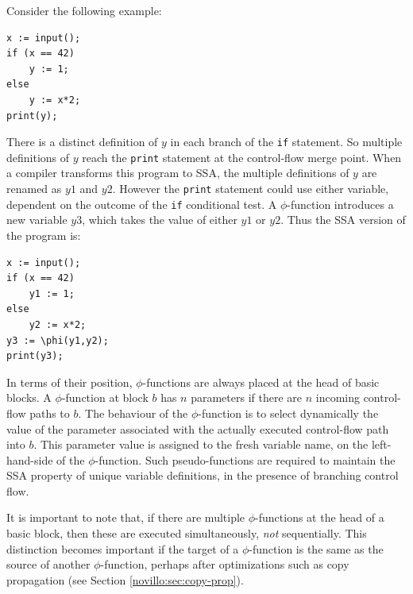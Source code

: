 Consider the following example:

\begin{verbatim}
x := input();
if (x == 42)
    y := 1;
else
    y := x*2;
print(y);
\end{verbatim}

There is a distinct definition of $y$ in each branch of the \texttt{if}
statement. So multiple definitions of $y$ reach the \texttt{print} statement
at the control-flow merge point. When a compiler transforms this program 
to SSA,
the multiple definitions of $y$ are renamed as $y1$ and $y2$. However 
the \texttt{print} statement could use either variable, dependent on the
outcome of the \texttt{if} conditional test. A $\phi$-function introduces
a new variable $y3$, which takes the value of either $y1$ or $y2$.
Thus the SSA version of the program is:

\begin{verbatim}
x := input();
if (x == 42)
    y1 := 1;
else
    y2 := x*2;
y3 := \phi(y1,y2);
print(y3);
\end{verbatim}



In terms of their position, 
$\phi$-functions are always placed at the head of basic blocks.
A $\phi$-function at block $b$ has
$n$ parameters if there are $n$ incoming control-flow paths to $b$.
The behaviour of the $\phi$-function is to select dynamically
the value of the parameter associated with the actually executed
control-flow path into $b$.
This parameter value is assigned to the fresh variable name,
on the left-hand-side of the $\phi$-function.
Such pseudo-functions are required to maintain the SSA property
of unique variable definitions,
in the presence of branching control flow.


It is important to note that, if there are multiple $\phi$-functions
at the head of a basic block, then these are executed simultaneously,
\textit{not} sequentially.
This distinction becomes important if the target of a $\phi$-function
is the same as the source of another $\phi$-function, perhaps after
optimizations such as copy propagation
(see Section \ref{novillo:sec:copy-prop}).

